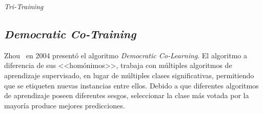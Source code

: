\begin{algorithm}[H]
  	\BlankLine
  	
	\caption{\textit{Tri-Training}}\label{alg:Tri-Training}
\end{algorithm}

\subsection{\textit{Democratic Co-Training}}
Zhou~\cite{zhou2004democratic} en 2004 presentó el algoritmo \textit{Democratic Co-Learning}. El algoritmo a diferencia de sus <<homónimos>>, trabaja con múltiples algoritmos de aprendizaje supervisado, en lugar de múltiples clases significativas, permitiendo que se etiqueten nuevas instancias entre ellos. Debido a que diferentes algoritmos de aprendizaje poseen diferentes sesgos, seleccionar la clase más votada por la mayoría produce mejores predicciones.

